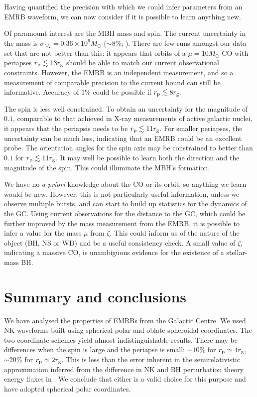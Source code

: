 Having quantified the precision with which we could infer parameters from an EMRB waveform, we can now consider if it is possible to learn anything new.

Of paramount interest are the MBH mass and spin. The current uncertainty in the mass is $\sigma_{M_\bullet} = 0.36 \times 10^6 M_\odot$ ($\sim 8\%$; \citealt{Gillessen2009}). There are few runs amongst our data set that are not better than this: it appears that orbits of a $\mu = 10 M_\odot$ CO with periapses $r_\mathrm{p} \lesssim 13 r_\mathrm{g}$ should be able to match our current observational constraints. However, the EMRB is an independent measurement, and so a measurement of comparable precision to the current bound can still be informative. Accuracy of $1\%$ could be possible if $r_\mathrm{p} \lesssim 8 r_\mathrm{g}$.

The spin is less well constrained. To obtain an uncertainty for the magnitude of $0.1$, comparable to that achieved in X-ray measurements of active galactic nuclei, it appears that the periapsis needs to be $r_\mathrm{p} \lesssim 11 r_\mathrm{g}$. For smaller periapses, the uncertainty can be much less, indicating that an EMRB could be an excellent probe. The orientation angles for the spin axis may be constrained to better than $0.1$ for $r_\mathrm{p} \lesssim 11 r_\mathrm{g}$. It may well be possible to learn both the direction and the magnitude of the spin. This could illuminate the MBH's formation.

We have no {\it a priori} knowledge about the CO or its orbit, so anything we learn would be new. However, this is not particularly useful information, unless we observe multiple bursts, and can start to build up statistics for the dynamics of the GC. Using current observations for the distance to the GC, which could be further improved by the mass measurement from the EMRB, it is possible to infer a value for the mass $\mu$ from $\zeta$. This could inform us of the nature of the object (BH, NS or WD) and be a useful consistency check. A small value of $\zeta$, indicating a massive CO, is unambiguous evidence for the existence of a stellar-mass BH.

\section{Summary and conclusions}

We have analysed the properties of EMRBs from the Galactic Centre. We used NK waveforms built using spherical polar and oblate spheroidal coordinates. The two coordinate schemes yield almost indistinguishable results. There may be differences when the spin is large and the periapse is small: $\sim 10\%$ for $r_\mathrm{p} \simeq 4 r_\mathrm{g}$, $\sim 20\%$ for $r_\mathrm{p} \simeq 2 r_\mathrm{g}$. This is less than the error inherent in the semirelativistic approximation inferred from the difference in NK and BH perturbation theory energy fluxes in . We conclude that either is a valid choice for this purpose and have adopted spherical polar coordinates.

